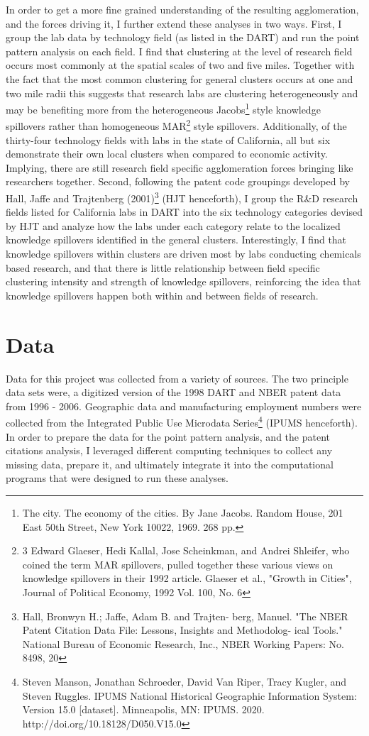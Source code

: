 \documentclass[12pt,letterpaper]{article}
\begin{document}
\par 
In order to get a more fine grained understanding of the resulting agglomeration, and the forces driving it, I further extend these analyses in two ways. First, I group the lab data by technology field (as listed in the DART) and run the point pattern analysis on each field. I find that clustering at the level of research field occurs most commonly at the spatial scales of two and five miles. Together with the fact that the most common clustering for general clusters occurs at one and two mile radii this suggests that research labs are clustering heterogeneously and may be benefiting more from the heterogeneous Jacobs\footnote{The city. The economy of the cities. By Jane Jacobs. Random House, 201 East 50th Street, New York 10022, 1969. 268 pp.} style knowledge spillovers rather than homogeneous MAR\footnote{3
 Edward Glaeser, Hedi Kallal, Jose
Scheinkman, and Andrei Shleifer, who coined
the term MAR spillovers, pulled together
these various views on knowledge spillovers in
their 1992 article. Glaeser et al., "Growth in Cities", Journal of Political Economy, 1992 Vol. 100, No. 6} style spillovers. Additionally, of the thirty-four technology fields with labs in the state of California, all but six demonstrate their own local clusters when compared to economic activity. Implying, there are still research field specific agglomeration forces bringing like researchers together. Second, following the patent code groupings developed by Hall, Jaffe and Trajtenberg (2001)\footnote{Hall, Bronwyn H.; Jaffe, Adam B. and Trajten-
 berg, Manuel. "The NBER Patent Citation
 Data File: Lessons, Insights and Methodolog-
 ical Tools." National Bureau of Economic
 Research, Inc., NBER Working Papers: No.
 8498, 20} (HJT henceforth), I group the R\&D research fields listed for California labs in DART into the six technology categories devised by HJT and analyze how the labs under each category relate to the localized knowledge spillovers identified in the general clusters. Interestingly, I find that knowledge spillovers within clusters are driven most by labs conducting chemicals based research, and that there is little relationship between field specific clustering intensity and strength of knowledge spillovers, reinforcing the idea that knowledge spillovers happen both within and between fields of research. 
\section{Data}
Data for this project was collected from a variety of sources. The two principle data sets were, a digitized version of the 1998 DART and NBER patent data from 1996 - 2006. Geographic data and manufacturing employment numbers were collected from the Integrated Public Use Microdata Series\footnote{Steven Manson, Jonathan Schroeder, David Van Riper, Tracy Kugler, and Steven Ruggles. IPUMS National Historical Geographic Information System: Version 15.0 [dataset]. Minneapolis, MN: IPUMS. 2020. http://doi.org/10.18128/D050.V15.0} (IPUMS henceforth). In order to prepare the data for the point pattern analysis, and the patent citations analysis, I leveraged different computing techniques to collect any missing data, prepare it, and ultimately integrate it into the computational programs that were designed to run these analyses. 
\end{document}
